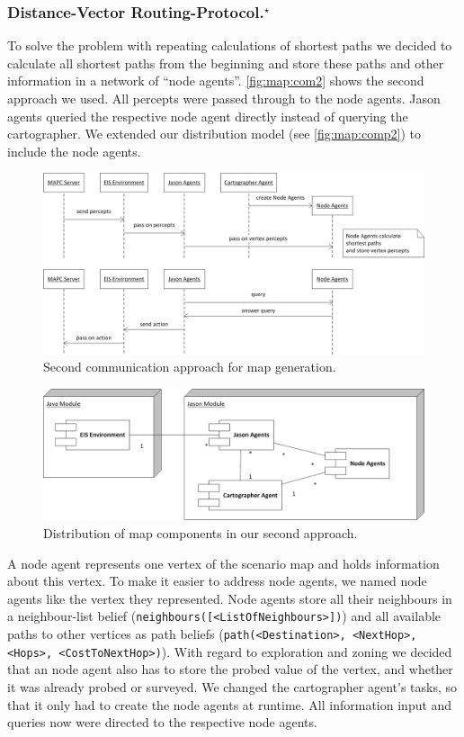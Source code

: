 \subsubsection[Distance-Vector Routing Protocol]{Distance-Vector Routing-Protocol.$^\star$}\label{alg:map_dv}
To solve the problem with repeating calculations of shortest paths we decided to calculate all shortest paths from the beginning and store these paths and other information in a network of ``node agents''.
\autoref{fig:map:com2} shows the second approach we used.
All percepts were passed through to the node agents.
Jason agents queried the respective node agent directly instead of querying the cartographer.
We extended our distribution model (see \autoref{fig:map:comp2}) to include the node agents.
\begin{figure}
  \centering
  \includegraphics[width=\linewidth]{images/map_com_2.png}
  \caption{Second communication approach for map generation.}
  \label{fig:map:com2}
\end{figure}

\begin{figure}
  \centering
  \includegraphics[width=\linewidth]{images/map_comp_2.png}
  \caption{Distribution of map components in our second approach.}
  \label{fig:map:comp2}
\end{figure}

A node agent represents one vertex of the scenario map and holds information about this vertex.
To make it easier to address node agents, we named node agents like the vertex they represented.
Node agents store all their neighbours in a neighbour-list belief (\texttt{neighbours([<ListOfNeighbours>])}) and all available paths to other vertices as path beliefs (\texttt{path(<Destination>, <NextHop>, <Hops>, <CostToNextHop>)}).
With regard to exploration and zoning we decided that an node agent also has to store the probed value of the vertex, and whether it was already probed or surveyed.
We changed the cartographer agent's tasks, so that it only had to create the node agents at runtime.
All information input and queries now were directed to the respective node agents.

